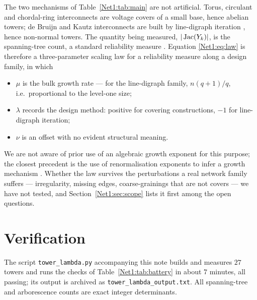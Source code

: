The two mechanisms of Table~\ref{Net1:tab:main} are not artificial. Torus, circulant and
chordal-ring interconnects are voltage covers of a small base, hence abelian towers; de
Bruijn and Kautz interconnects are built by line-digraph iteration \cite{FAY83,FYA84,FL92},
hence non-normal towers. The quantity being measured, $|\operatorname{Jac}(Y_k)|$, is the spanning-tree
count, a standard reliability measure \cite{Boesch86,Colbourn87,BH09}. Equation
\eqref{Net1:eq:law} is therefore a three-parameter scaling law for a reliability measure along a
design family, in which
\begin{itemize}
\item $\mu$ is the bulk growth rate --- for the line-digraph family, $n(q{+}1)/q$, i.e.\
proportional to the level-one size;
\item $\lambda$ records the design method: positive for covering constructions, $-1$ for
line-digraph iteration;
\item $\nu$ is an offset with no evident structural meaning.
\end{itemize}
We are not aware of prior use of an algebraic growth exponent for this purpose; the closest
precedent is the use of renormalisation exponents to infer a growth mechanism
\cite{SHM06}. Whether the law survives the perturbations a real network family suffers ---
irregularity, missing edges, coarse-grainings that are not covers --- we have not tested,
and Section~\ref{Net1:sec:scope} lists it first among the open questions.

\section{Verification}\label{Net1:sec:battery}

The script \texttt{tower\_lambda.py} accompanying this note builds and measures $27$ towers
and runs the checks of Table~\ref{Net1:tab:battery} in about $7$ minutes, all passing; its output
is archived as \texttt{tower\_lambda\_output.txt}. All spanning-tree and arborescence counts
are exact integer determinants.

